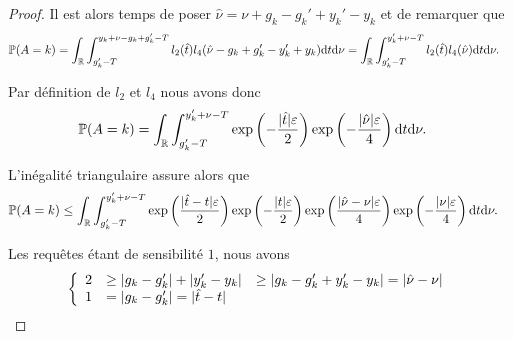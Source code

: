 \begin{proof}
    Il est alors temps de poser \(\hat \nu = \nu + g_k - g_k' + y_k' - y_k  \) et de remarquer que
    \begin{align*}
        \mathbb P(A = k) & = \int_{\mathbb{R}}\int_{g_k' - T}^{y_k + \nu - g_k + g_k' - T} l_2(\hat t )l_4(\hat\nu - g_k + g_k' - y_k' + y_k) \mathrm{d} t \mathrm{d} \nu = \int_{\mathbb{R}}\int_{g_k' - T }^{y_k' + \nu - T } l_2(\hat t )l_4(\hat\nu) \mathrm{d} t \mathrm{d} \nu.
    \end{align*}

    Par définition de \(l_2\) et \(l_4\) nous avons donc
    \begin{align*}
        \mathbb P(A = k) & =  \int_{\mathbb{R}}\int_{g_k' - T}^{y_k' + \nu -T} \exp\left(-\dfrac{|\hat t|\varepsilon}{2}\right)\exp\left(-\dfrac{|\hat\nu|\varepsilon}{4}\right) \mathrm{d} t \mathrm{d} \nu.
    \end{align*}

    L'inégalité triangulaire assure alors que 
    \begin{align*}
        \mathbb P(A = k) & \leq  \int_{\mathbb{R}}\int_{g_k' - T}^{y_k' + \nu - T } \exp\left(\dfrac{|\hat t - t|\varepsilon}{2}\right)\exp\left(-\dfrac{|t|\varepsilon}{2}\right)\exp\left(\dfrac{|\hat\nu - \nu|\varepsilon}{4}\right)\exp\left(-\dfrac{|\nu|\varepsilon}{4}\right) \mathrm{d} t \mathrm{d} \nu.
    \end{align*}

    Les requêtes étant de sensibilité \(1\), nous avons 
    \[
        \left\{ 
            \begin{array}[]{rlc}
                2 & \geq |g_k - g_k'| + |y_k' - y_k | & \geq|g_k - g_k' + y_k' - y_k | = |\hat\nu - \nu|\\
                1 & = | g_k - g_k' | = |\hat t - t|\\
            \end{array}
        \right.    
    \]


\end{proof}
